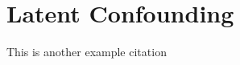 \section{Latent Confounding}
\label{sec:latent-confounding}

\blindtext[2]

This is another example citation \cite{wang_2019_blessings}
